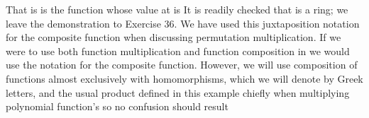 \documentclass[11pt,oneside]{article}
\begin{document}
\begin{BookBody}
\noindent That is is the function whose value at  is  It is readily checked that  is a ring; we leave the demonstration to Exercise 36. We have used this juxtaposition 
notation \BookInline{\sigma \mu } for the composite function  when discussing permutation multiplication. If we were to use both function multiplication and function composition in  we would use the notation  for the composite function. However, we will use composition of functions almost exclusively with homomorphisms, which we will denote by Greek letters, and the usual product defined in this example chiefly when multiplying polynomial function’s  so no confusion should result\BookEnd{\blacktriangle}

\end{BookBody}

\BookNarrativetrue
\end{document}

